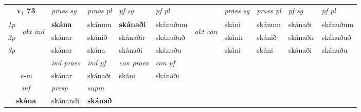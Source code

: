 \noindent
\begin{tabular}{lllllllllll} \toprule
\multicolumn{2}{c}{\textbf{v{\textsubscript{1}}} \Large{\textbf{73}}}  &  \textit{praes sg}  & \textit{praes pl}  &\textit{ pf sg} & \textit{pf pl} &  &  \textit{praes sg}  & \textit{praes pl}  & \textit{pf sg} & \textit{pf pl } \\*
	\cmidrule{3-6} \cmidrule{8-11}
 {\textit{1p}} & \multirow{3}{*}{\begin{turn}{90}\textit{akt ind}\end{turn}} & \textbf{skána} & skánum & \textbf{skánaði} & skánuðum & \multirow{3}{*}{\begin{turn}{90}\textit{akt con}\end{turn}} &skáni & skánum & skánaði & skánuðum\\*
 {\textit{2p}} &  &  skánar  & skánið & skánaðir & skánuðuð & & skánir & skánið & skánaðir & skánuðuð \\*
{\textit{3p}} &  & skánar & skána & skánaði & skánuðu & & skáni & skáni& skánaði & skánuðu \\*
\cmidrule{3-6} \cmidrule{8-11}

   & &  \textit{ind praes} & \textit{ind pf} & \textit{con praes} & \textit{con pf} \\*
\multicolumn{2}{c}{ \textit{e-m} } & skánar & skánaði & skáni & skánaði \\*

\cmidrule{3-4}
   \multicolumn{2}{c}{\textit{inf}}     & \textit{presp} & \textit{supin}   \\*
  \multicolumn{2}{c}{\textbf{skána}}      & skánandi &  \textbf{skánað}   \\*
\end{tabular}

